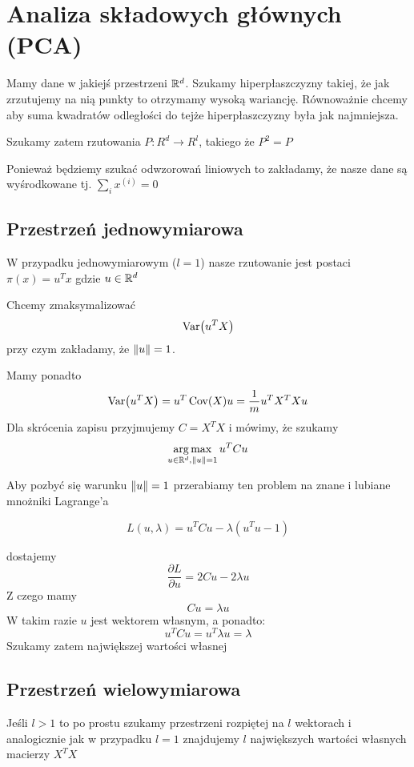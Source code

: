 \section{Analiza składowych głównych (PCA)}

Mamy dane w jakiejś przestrzeni \( \mathbb{R}^d \). Szukamy hiperpłaszczyzny takiej, że jak zrzutujemy na nią punkty to otrzymamy wysoką wariancję.
Równoważnie chcemy aby suma kwadratów odległości do tejże hiperpłaszczyzny była jak najmniejsza.

Szukamy zatem rzutowania \( P : R^d \rightarrow R^l \), takiego że \( P^2 = P \)

Ponieważ będziemy szukać odwzorowań liniowych to zakładamy, że nasze dane są wyśrodkowane tj. \( \sum_i x^{(i)} = 0 \)

\subsection{Przestrzeń jednowymiarowa}

W przypadku jednowymiarowym (\( l = 1 \)) nasze rzutowanie jest postaci \( \pi(x) = u^T x \) gdzie \( u \in \mathbb{R}^d \)

Chcemy zmaksymalizować
\[
	\Var\pars{u^T X}
\]
przy czym zakładamy, że \( \left\Vert u \right\Vert = 1 \).

Mamy ponadto
\[
	\Var\pars{u^T X} = u^T \Cov(X) u = \frac{1}{m} u^TX^TXu
\]
Dla skrócenia zapisu przyjmujemy \( C = X^TX\) i mówimy, że szukamy
\[
	\operatorname*{arg\,max}_{u \in \mathbb{R}^d, \left\Vert u \right\Vert = 1} u^T C u
\]

Aby pozbyć się warunku \( \left\Vert u \right\Vert = 1 \) przerabiamy ten problem na znane i lubiane mnożniki Lagrange'a

\[
	L(u, \lambda) = u^T C u - \lambda(u^Tu - 1)
\]

dostajemy
\[
	\frac{\partial L}{\partial u} = 2Cu - 2 \lambda u
\]
Z czego mamy
\[
	Cu = \lambda u
\]
W takim razie \( u \) jest wektorem własnym, a ponadto:
\[
	u^T C u = u^T \lambda u = \lambda
\]
Szukamy zatem największej wartości własnej

\subsection{Przestrzeń wielowymiarowa}

Jeśli \( l > 1 \) to po prostu szukamy przestrzeni rozpiętej na \( l \) wektorach i analogicznie jak w przypadku \( l = 1 \) znajdujemy \( l \) największych wartości własnych macierzy \( X^TX \)


